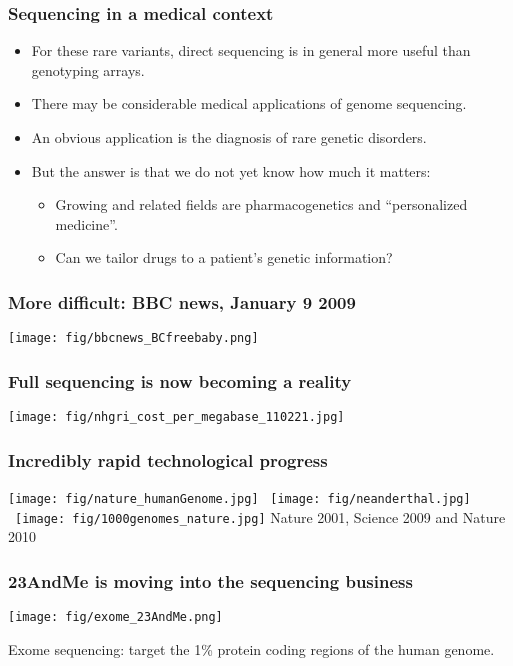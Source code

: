 \documentclass{beamer}
\begin{document}
\begin{frame}
  \frametitle{Sequencing in a medical context}
  \begin{itemize}
  \item For these rare variants, direct sequencing is in general more useful than genotyping arrays.
  \item There may be considerable medical applications of genome sequencing.
  \item An obvious application is the diagnosis of rare genetic disorders.
  \item But the answer is that we do not yet know how much it matters:
    \begin{itemize}
    \item Growing and related fields are pharmacogenetics and ``personalized medicine''.
    \item Can we tailor drugs to a patient's genetic information?
    \end{itemize}
  \end{itemize}
\end{frame}


\begin{frame}
  \frametitle{More difficult: BBC news, January 9 2009}
  \texttt{[image: fig/bbcnews\_BCfreebaby.png]}
\end{frame}


\begin{frame}
  \frametitle{Full sequencing is now becoming a reality}
  \begin{center}
    \texttt{[image: fig/nhgri\_cost\_per\_megabase\_110221.jpg]}
  \end{center}
\end{frame}


\begin{frame}
  \frametitle{Incredibly rapid technological progress}
  \texttt{[image: fig/nature\_humanGenome.jpg]} \ 
  \texttt{[image: fig/neanderthal.jpg]} \
  \texttt{[image: fig/1000genomes\_nature.jpg]}
  \vspace{1cm}
  Nature 2001, Science 2009 and Nature 2010
\end{frame}


\begin{frame}
   \frametitle{23AndMe is moving into the sequencing business}
   \begin{center}
     \texttt{[image: fig/exome\_23AndMe.png]}
   \end{center}
   Exome sequencing: target the 1\% protein coding regions of the human genome.
\end{frame}
\end{document}
